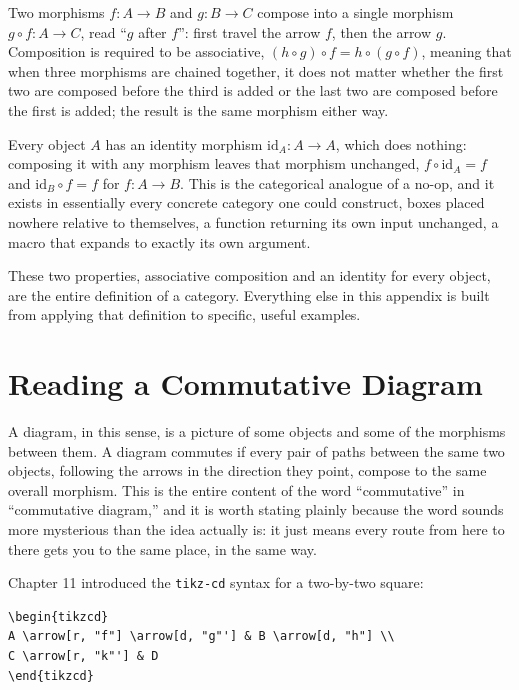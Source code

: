 Two morphisms \(f : A \to B\) and \(g : B \to C\) compose into a single morphism \(g \circ f : A \to C\), read ``\(g\) after \(f\)'': first travel the arrow \(f\), then the arrow \(g\). Composition is required to be associative, \((h \circ g) \circ f = h \circ (g \circ f)\), meaning that when three morphisms are chained together, it does not matter whether the first two are composed before the third is added or the last two are composed before the first is added; the result is the same morphism either way.

Every object \(A\) has an identity morphism \(\mathrm{id}_A : A \to A\), which does nothing: composing it with any morphism leaves that morphism unchanged, \(f \circ \mathrm{id}_A = f\) and \(\mathrm{id}_B \circ f = f\) for \(f : A \to B\). This is the categorical analogue of a no-op, and it exists in essentially every concrete category one could construct, boxes placed nowhere relative to themselves, a function returning its own input unchanged, a macro that expands to exactly its own argument.

These two properties, associative composition and an identity for every object, are the entire definition of a category. Everything else in this appendix is built from applying that definition to specific, useful examples.

\hypertarget{b.3-reading-a-commutative-diagram}{%
\section{Reading a Commutative Diagram}\label{b.3-reading-a-commutative-diagram}}

A diagram, in this sense, is a picture of some objects and some of the morphisms between them. A diagram commutes if every pair of paths between the same two objects, following the arrows in the direction they point, compose to the same overall morphism. This is the entire content of the word ``commutative'' in ``commutative diagram,'' and it is worth stating plainly because the word sounds more mysterious than the idea actually is: it just means every route from here to there gets you to the same place, in the same way.

Chapter 11 introduced the \texttt{tikz-cd} syntax for a two-by-two square:

\begin{verbatim}
\begin{tikzcd}
A \arrow[r, "f"] \arrow[d, "g"'] & B \arrow[d, "h"] \\
C \arrow[r, "k"'] & D
\end{tikzcd}
\end{verbatim}

